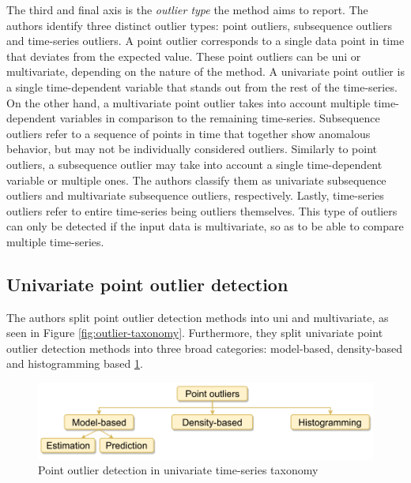 The third and final axis is the \textit{outlier type} the method aims to report. The authors identify three distinct outlier types: point outliers, subsequence outliers and time-series outliers. A point outlier corresponds to a single data point in time that deviates from the expected value. These point outliers can be uni or multivariate, depending on the nature of the method. A univariate point outlier is a single time-dependent variable that stands out from the rest of the time-series. On the other hand, a multivariate point outlier takes into account multiple time-dependent variables in comparison to the remaining time-series. Subsequence outliers refer to a sequence of points in time that together show anomalous behavior, but may not be individually considered outliers. Similarly to point outliers, a subsequence outlier may take into account a single time-dependent variable or multiple ones. The authors classify them as univariate subsequence outliers and multivariate subsequence outliers, respectively. Lastly, time-series outliers refer to entire time-series being outliers themselves. This type of outliers can only be detected if the input data is multivariate, so as to be able to compare multiple time-series.

\subsection*{Univariate point outlier detection}

The authors split point outlier detection methods into uni and multivariate, as seen in Figure \ref{fig:outlier-taxonomy}. Furthermore, they split univariate point outlier detection methods into three broad categories: model-based, density-based and histogramming based \ref{fig:point-outlier-taxonomy}.

\begin{figure}[!htb]
  \begin{center}
    \includegraphics[scale=1]{figures/taxonomy-point-outlier-uni.png}
    \caption{Point outlier detection in univariate time-series taxonomy}
    \label{fig:point-outlier-taxonomy}
  \end{center}
\end{figure}

